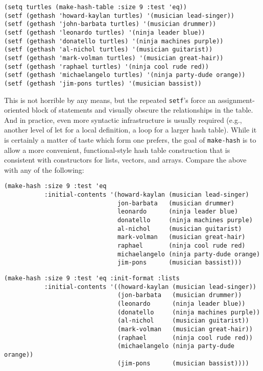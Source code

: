 \documentclass[11pt]{article}
\begin{document}
\begin{verbatim}
(setq turtles (make-hash-table :size 9 :test 'eq))
(setf (gethash 'howard-kaylan turtles) '(musician lead-singer))
(setf (gethash 'john-barbata turtles) '(musician drummer))
(setf (gethash 'leonardo turtles) '(ninja leader blue))
(setf (gethash 'donatello turtles) '(ninja machines purple))
(setf (gethash 'al-nichol turtles) '(musician guitarist))
(setf (gethash 'mark-volman turtles) '(musician great-hair))
(setf (gethash 'raphael turtles) '(ninja cool rude red))
(setf (gethash 'michaelangelo turtles) '(ninja party-dude orange))
(setf (gethash 'jim-pons turtles) '(musician bassist))
\end{verbatim}


 

  \noindent
  This is not horrible by any means, but the repeated \texttt{setf}'s force an
  assignment-oriented block of statements and visually obscure the
  relationships in the table. And in practice, even more syntactic
  infrastructure is usually required (e.g., another level of let for a
  local definition, a loop for a larger hash table). While it is certainly
  a matter of taste which form one prefers, the goal of \texttt{make-hash} is to
  allow a more convenient, functional-style hash table construction that
  is consistent with constructors for lists, vectors, and arrays. Compare
  the above with any of the following:


\begin{verbatim}
(make-hash :size 9 :test 'eq
           :initial-contents '(howard-kaylan (musician lead-singer)
                               jon-barbata   (musician drummer)
                               leonardo      (ninja leader blue)
                               donatello     (ninja machines purple)
                               al-nichol     (musician guitarist)
                               mark-volman   (musician great-hair)
                               raphael       (ninja cool rude red)
                               michaelangelo (ninja party-dude orange)
                               jim-pons      (musician bassist)))
\end{verbatim}





\begin{verbatim}
(make-hash :size 9 :test 'eq :init-format :lists
           :initial-contents '((howard-kaylan (musician lead-singer))
                               (jon-barbata   (musician drummer))
                               (leonardo      (ninja leader blue))
                               (donatello     (ninja machines purple))
                               (al-nichol     (musician guitarist))
                               (mark-volman   (musician great-hair))
                               (raphael       (ninja cool rude red))
                               (michaelangelo (ninja party-dude orange))
                               (jim-pons      (musician bassist))))
\end{verbatim}
\end{document}
